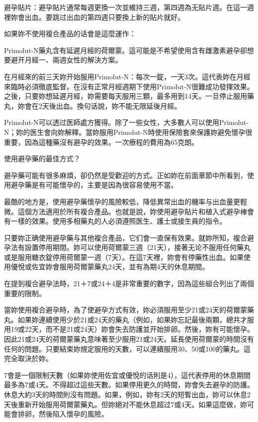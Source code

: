 \documentclass[12pt,UTF8]{ctexbook}
\begin{document}
避孕貼片：避孕貼片通常每週更換一次並維持三週，第四週為无貼片週。在這一週裡妳會出血。要跳过出血的第四週只要換上新的貼片就好。



如果妳不使用複合產品的话會是這麼運作：



Primolut-N藥丸含有延遲月經的荷爾蒙。這可能是不希望使用含有雌激素避孕卻想要避开月經一、兩週女性的解決方案。

在月經來的前三天妳开始服用Primolut-N：每次一錠，一天3次。這代表妳在月經來臨時必須徹底監督。在沒有正常月經週期下使用Primolut-N很難成功發揮效果。之後，只要妳想延遲月經，妳需要每天服用三顆，最多用到14天。一旦停止服用藥丸，妳會在2天後出血。換句话說，妳不能无限延後月經。

Primolut-N可以透过医師處方獲得。除了一些女性，大多數人可以使用Primolut-N；妳的医生會向妳解釋。當妳服用Primolut-N時使用保險套來保護妳避免懷孕很重要，因為這種藥沒有避孕的效果。一次療程的費用為65克朗。





使用避孕藥的最佳方式？




避孕藥可能有很多麻煩，卻仍然是受歡迎的方式。正如妳在前面章節中所看到，使用避孕藥是有可能懷孕的，主要是因為很容易使用不當。

最酷的地方是，使用避孕藥懷孕的風險較低，降低異常出血的機率与出血量更輕微。這個方法適用於所有複合產品。也就是說，妳使用避孕貼片和植入式避孕棒會有一樣的效果。使用多相藥丸的人必須遵照医生、護士或接生員的指令。

只要妳正确使用避孕藥与其他複合產品，它们會一直保有效果。就妳所知，複合避孕法有設置停用期間。妳可以使用荷爾蒙三週（21天），接著无论不服用任何藥丸或是服用糖衣錠停用荷爾蒙一週（7天）。在這7天裡，妳會有停藥性出血。如果使用優悅或佐宜妳會服用荷爾蒙藥丸24天，並有為期4天的休息期間。

在提到複合避孕法時，21＋7或24＋4是非常重要的數字，因為這些組合列出了兩個重要的限制。

當妳使用複合避孕時，為了使避孕方式有效，妳必須服用至少21或24天的荷爾蒙藥丸。如果妳連續使用少於21或24天的藥丸（例如，如果妳忘記最後兩顆，總共才服用19或22天，而不是21或24天）妳會失去防護並开始排卵。然後，妳有可能懷孕。因此21或24天的荷爾蒙藥丸意味著至少服用21或24天。延長使用荷爾蒙的時間沒有任何的問題。只要結束妳規定服用的天數，可以連續服用30、50或100的藥丸。這完全取決於妳。

7會是一個限制天數（如果妳使用佐宜或優悅的话則是4），這代表停用的休息期間最多為7或4天。不得超过這些天數。如果停用更久的時間，妳會失去避孕的防護。休息大約3天的時間則沒有問題。如果，例如，妳有2天的短暫出血，妳可以休息2天後重新开始服用荷爾蒙藥丸。但妳絕对不能休息超过7或4天。如果這麼做，妳可能會排卵，然後陷入懷孕的風險。
\end{document}
